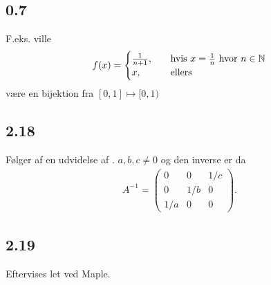		\subsection{0.7} 

			F.eks. ville
				\begin{align*}
					f(x)= \begin{cases}
					\frac{1}{n+1}, \quad &\text{hvis $x=\frac{1}{n}$ hvor $n\in \mathbb{N}$}\\
					x, \quad &\text{ellers}
					\end{cases}
				\end{align*} 
			være en bijektion fra $[0,1] \mapsto [0,1)$

		\subsection{2.18}

			Følger af en udvidelse af \cite[Eksempel 0.1.4]{hesselholt2017}. $a,b,c\neq 0$ og den inverse er da 
				\begin{align*}
					A^{-1}=\left(\begin{array}{ccc} {0} & {0} & {1/c} \\ {0} & {1/b} & {0} \\ {1/a} & {0} & {0} \end{array}\right).
				\end{align*} 

		\subsection{2.19}

			Eftervises let ved Maple.
